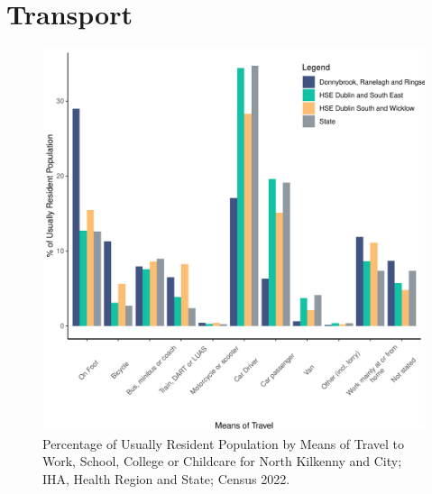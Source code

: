 \documentclass{article}
\begin{document}
\section{Transport}\label{sect:Trans}
\begin{figure}[H]
	\centering
	\includegraphics[width = 120mm]{../figures/TravelED.pdf}
	\caption{Percentage of Usually Resident Population by Means of Travel to Work, School, College or Childcare for North Kilkenny and City; IHA, Health Region and State; Census 2022.}
	\label{fig:vbnv}
	\end{figure}
\end{document}
